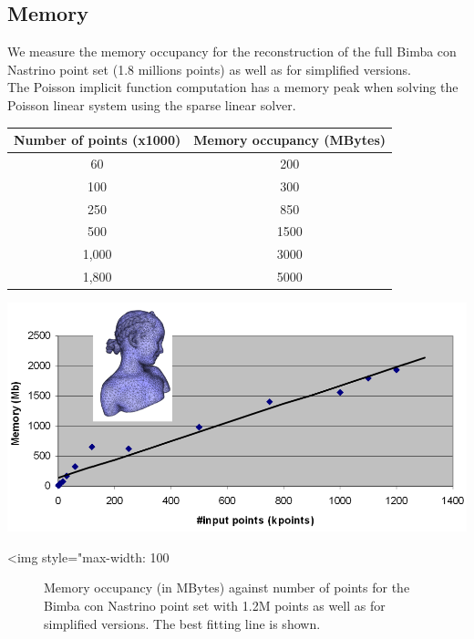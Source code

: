 \subsection{Memory}

We measure the memory occupancy for the reconstruction of the full Bimba con Nastrino point set (1.8 millions points) as well as for simplified versions.\\
The Poisson implicit function computation has a memory peak when solving the Poisson linear system using the sparse linear solver.  \\

\begin{tabular}{|c|c|}
  \hline
  Number of points (x1000) & Memory occupancy (MBytes) \\
  \hline
  60                         & 200 \\
  100                        & 300 \\
  250                        & 850 \\
  500                        & 1500 \\
  1,000                       & 3000 \\
  1,800                       & 5000 \\
  \hline
\end{tabular}

\begin{center}
    \begin{ccTexOnly}
        \includegraphics[width=1.0\textwidth]{Surface_reconstruction_points_3/memory_bench}
    \end{ccTexOnly}
    \begin{ccHtmlOnly}
        <img style="max-width: 100%
    \end{ccHtmlOnly}
    \begin{figure}[h]
        \caption{Memory occupancy (in MBytes) against number of points
                 for the Bimba con Nastrino point set with 1.2M points
                 as well as for simplified versions.
                 The best fitting line is shown.}
        \label{Surface_reconstruction_points_3-fig-memory_bench}
    \end{figure}
\end{center}



